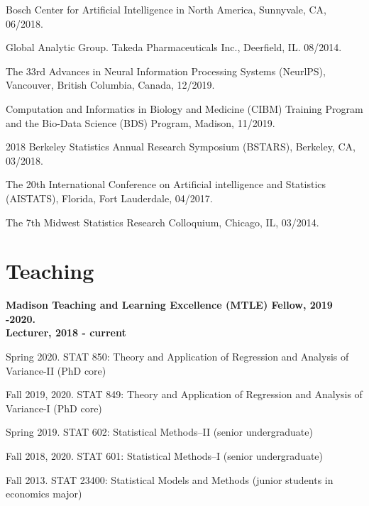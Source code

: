 \documentclass[letterpaper]{article}
\renewenvironment{itemize}{
  \begin{list}{}{
    \setlength{\leftmargin}{1.5em}
  }
}{
  \end{list}
}
\begin{document}
\begin{itemize}
\item Bosch Center for Artificial Intelligence in North America, Sunnyvale, CA, 06/2018.
\item Global Analytic Group. Takeda Pharmaceuticals Inc., Deerfield, IL. 08/2014.

\item The 33rd Advances in Neural Information Processing Systems (NeurlPS), Vancouver, British Columbia, Canada, 12/2019. 
\item Computation and Informatics in Biology and Medicine (CIBM) Training Program and the Bio-Data Science (BDS) Program, Madison, 11/2019. 
\item 2018 Berkeley Statistics Annual Research Symposium (BSTARS), Berkeley, CA, 03/2018. 
\item The 20th International Conference on Artificial intelligence and Statistics (AISTATS), Florida, Fort Lauderdale, 04/2017. 
\item The 7th Midwest Statistics Research Colloquium, Chicago, IL, 03/2014.
\end{itemize}
\section*{Teaching}
{\bf Madison Teaching and Learning Excellence (MTLE) Fellow, 2019 -2020.} \\

{\bf Lecturer, 2018 - current}
\begin{itemize}
\item Spring 2020. STAT 850: Theory and Application of Regression and Analysis of Variance-II (PhD core)
\item Fall 2019, 2020. STAT 849: Theory and Application of Regression and Analysis of Variance-I (PhD core)
\item Spring 2019. STAT 602: Statistical Methods--II (senior undergraduate)
\item Fall 2018, 2020. STAT 601: Statistical Methods--I (senior undergraduate)
\item Fall 2013. STAT 23400: Statistical Models and Methods (junior students in economics major)
\end{itemize}
\end{document}
